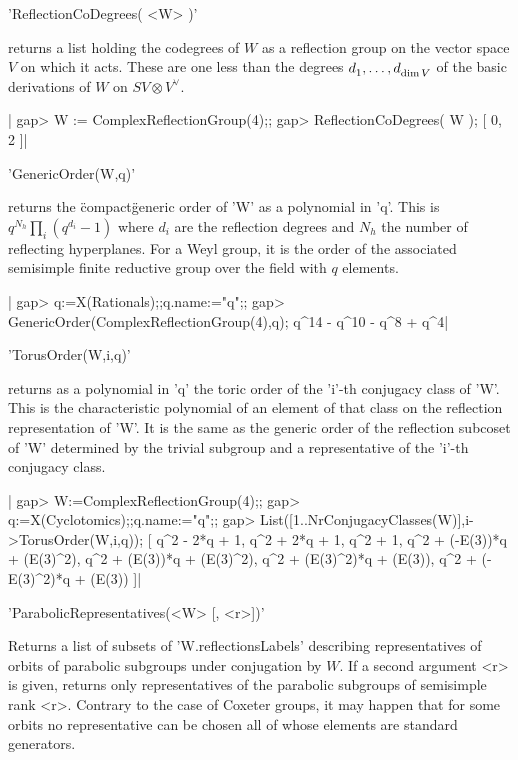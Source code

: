'ReflectionCoDegrees( <W> )'

returns  a list holding the  codegrees of $W$ as  a reflection group on the
vector  space $V$  on which  it acts.  These are  one less than the degrees
$d^{\*}_1,\ldots,d^{\*}_{\dim  V}$  of  the  basic  derivations  of  $W$ on
$SV\otimes V^\vee$.

|    gap> W := ComplexReflectionGroup(4);;
    gap> ReflectionCoDegrees( W );
    [ 0, 2 ]|


'GenericOrder(W,q)'

returns  the \"compact\" generic order of 'W'  as a polynomial in 'q'. This
is  $q^{N_h}\prod_i(q^{d_i}-1)$ where $d_i$ are  the reflection degrees and
$N_h$  the number of  reflecting hyperplanes. For  a Weyl group,  it is the
order  of the associated  semisimple finite reductive  group over the field
with $q$ elements.

|    gap> q:=X(Rationals);;q.name:="q";;
    gap> GenericOrder(ComplexReflectionGroup(4),q);
    q^14 - q^10 - q^8 + q^4|


'TorusOrder(W,i,q)'

returns  as a  polynomial in  'q' the  toric order  of the 'i'-th conjugacy
class  of 'W'. This is the characteristic  polynomial of an element of that
class  on  the  reflection  representation  of  'W'.  It is the same as the
generic  order of the reflection subcoset  of 'W' determined by the trivial
subgroup and a representative of the 'i'-th conjugacy class.

|    gap> W:=ComplexReflectionGroup(4);;
    gap> q:=X(Cyclotomics);;q.name:="q";;
    gap> List([1..NrConjugacyClasses(W)],i->TorusOrder(W,i,q));
    [ q^2 - 2*q + 1, q^2 + 2*q + 1, q^2 + 1, q^2 + (-E(3))*q + (E(3)^2),
      q^2 + (E(3))*q + (E(3)^2), q^2 + (E(3)^2)*q + (E(3)),
      q^2 + (-E(3)^2)*q + (E(3)) ]|


'ParabolicRepresentatives(<W> [, <r>])'

Returns   a   list   of   subsets   of   'W.reflectionsLabels'   describing
representatives  of orbits of parabolic subgroups under conjugation by $W$.
If  a second  argument <r>  is given,  returns only  representatives of the
parabolic subgroups of semisimple rank <r>.
Contrary  to the case of Coxeter groups, it may happen that for some orbits
no  representative  can  be  chosen  all  of  whose  elements  are standard
generators.

